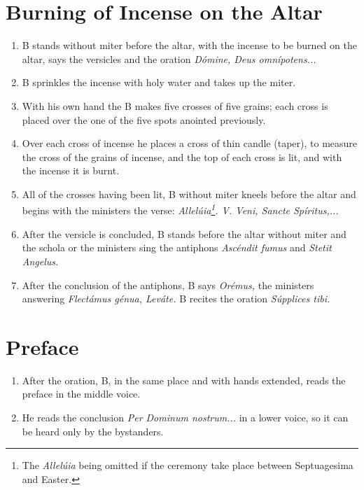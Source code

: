 \documentclass[twocolumn]{report}
\begin{document}
\section{Burning of Incense on the Altar}
\begin{enumerate}
	\item B stands without miter before the altar, with the incense to be burned on the altar, says the versicles and the oration \textit{Dómine, Deus omnípotens...}
	\item B sprinkles the incense with holy water and takes up the miter.
	\item With his own hand the B makes five crosses of five grains; each cross is placed over the one of the five spots anointed previously.
	\item Over each cross of incense he places a cross of thin candle (taper), to measure the cross of the grains of incense, and the top of each cross is lit, and with the incense it is burnt.
	\item All of the crosses having been lit, B without miter kneels before the altar and begins with the ministers the verse: \textit{Allelúia\footnote{The \textit{Allelúia} being omitted if the ceremony take place between Septuagesima and Easter.}. V. Veni, Sancte Spíritus,...}
	\item After the versicle is concluded, B stands before the altar without miter and the schola or the ministers sing the antiphons \textit{Ascéndit fumus} and \textit{Stetit Angelus.}
	\item After the conclusion of the antiphons, B says \textit{Orémus,} the ministers answering \textit{Flectámus génua, Leváte.} B recites the oration \textit{Súpplices tibi.}
\end{enumerate}
\section{Preface}
\begin{enumerate}
	\item After the oration, B, in the same place and with hands extended, reads the preface in the middle voice.
	\item He reads the conclusion \textit{Per Dominum nostrum...} in a lower voice, so it can be heard only by the bystanders.
\end{enumerate}
\end{document}
